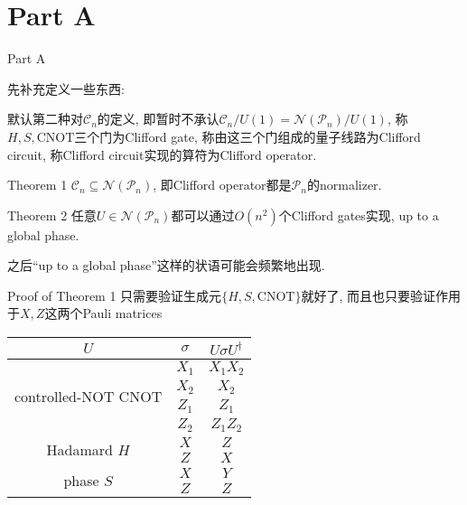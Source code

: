 \documentclass{beamer}
\begin{document}
\section{Part A}
\begin{frame}{Part A}
	
	先补充定义一些东西: 
	
	默认第二种对$\mathcal C_n$的定义, 即暂时不承认$\mathcal C_n / U(1) = \mathcal N(\mathcal P_n) / U(1)$, 称$H, S, \mathrm{CNOT}$三个门为Clifford gate, 称由这三个门组成的量子线路为Clifford circuit, 称Clifford circuit实现的算符为Clifford operator.\pause
	
\begin{block}{Theorem 1}
	$\mathcal C_n \subseteq \mathcal N(\mathcal P_n)$, 即Clifford operator都是$\mathcal P_n$的normalizer.
\end{block}
\begin{block}{Theorem 2}
	任意$U \in \mathcal N(\mathcal P_n)$都可以通过$O(n^2)$个Clifford gates实现, up to a global phase.
\end{block}

\pause 之后“up to a global phase”这样的状语可能会频繁地出现.
\end{frame}
\begin{frame}{Proof of Theorem 1}
	只需要验证生成元$\{ H, S, \mathrm{CNOT} \}$就好了, 而且也只要验证作用于$X, Z$这两个Pauli matrices\\
	
	\centering
	\begin{tabular}{c|c|c}
		$U$ & $\sigma$ & $U\sigma U^{\dagger}$\\
		\hline 
		\multirow{4}{*}{controlled-NOT $\mathrm{CNOT}$} & $X_1$ & $X_1X_2$\\
		& $X_2$ & $X_2$\\
		& $Z_1$ & $Z_1$\\
		& $Z_2$ & $Z_1Z_2$\\
		\hline
		\multirow{2}{*}{Hadamard $H$} & $X$ & $Z$\\
		& $Z$ & $X$\\
		\hline
		\multirow{2}{*}{phase $S$} & $X$ & $Y$\\
		& $Z$ & $Z$\\
	\end{tabular}
\end{frame}
\end{document}

